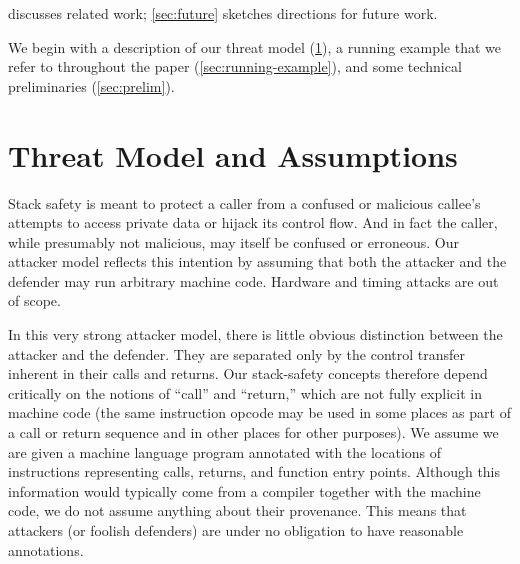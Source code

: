 \documentclass[acmsmall,review,anonymous]{acmart}\settopmatter{printfolios=true,printccs=false,printacmref=false}
\begin{document}
\begin{itemize}
\end{itemize}
 discusses related work;
\cref{sec:future} sketches directions for future work.

We begin with a description of our threat model
(\cref{sec:threat}), a running example that we refer to throughout the paper
(\cref{sec:running-example}),  and some technical preliminaries
(\cref{sec:prelim}).

\section{Threat Model and Assumptions}
\label{sec:threat}

Stack safety is meant to protect a caller from a confused or malicious callee's
attempts to access private data or hijack its control flow. And in fact the caller,
while presumably not malicious, may itself be confused or erroneous. Our attacker
model reflects this intention by assuming that both the attacker and the defender
may run arbitrary machine code. Hardware and timing attacks are out of scope.


\newcommand*{\rsp}{\textsc{sp}}

In this very strong attacker model, there is little obvious distinction between
the attacker and the defender. They are separated only by the control transfer
inherent in their calls and returns. Our stack-safety concepts therefore depend
critically on the notions of ``call'' and ``return,'' which are not fully explicit
in machine code (the same instruction opcode may be used in some places as part of
a call or return sequence and in other places for other purposes).
%
We assume we are given a machine language program annotated with the locations of
instructions representing calls, returns, and function entry points. Although this
information would typically come from a compiler together with the machine code,
we do not assume anything about their provenance. This means that attackers (or
foolish defenders) are under no obligation to have reasonable annotations.
\end{document}
